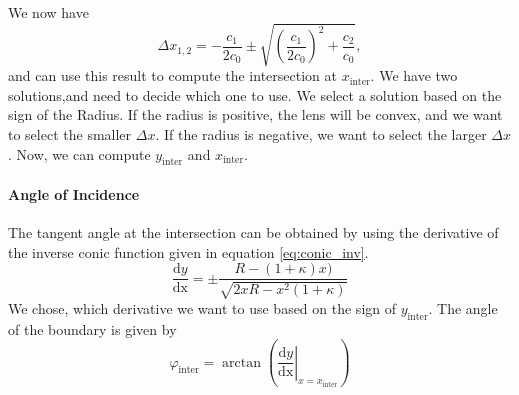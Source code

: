 \documentclass[12pt]{article}
\newcommand{\at}[2]{\left.#1\right|_{#2}}
\newcommand{\deriv}[2]{\frac{\mathrm{d}#1}{\mathrm{d#2}}}
\begin{document}
We now have
\begin{equation}\label{eq:conic_dx}
  \Delta x_{1, 2} = - \frac{c_1}{2 c_0} 
    \pm \sqrt{\left(\frac{c_1}{2 c_0}\right)^2 + \frac{c_2}{c_0}},
\end{equation}
and can use this result to compute the intersection at $x_\text{inter}$. We have two
solutions,and need to decide which one to use.
We select a solution based on the sign of the Radius. If the radius is positive, the lens
will be convex, and we want to select the smaller $\Delta x$. If the radius is negative,
we want to select the larger $\Delta x$.
Now, we can compute $y_\text{inter}$ and $x_\text{inter}$.

\paragraph{Angle of Incidence}
The tangent angle at the intersection can be obtained by using the derivative of the
inverse conic function given in equation \eqref{eq:conic_inv}.
\begin{equation}\label{eq:conic_inv_deriv}
  \deriv{y}{x} = \pm \frac{R - (1 + \kappa) x)}{\sqrt{2 x R - x^2(1 + \kappa)}}
\end{equation}
We chose, which derivative we want to use based on the sign of $y_\text{inter}$.
The angle of the boundary is given by
\begin{equation}\label{eq:conic_inter_angle}
  \varphi_\text{inter} = \arctan\left(\at{\deriv{y}{x}}{x = x_\text{inter}}\right)
\end{equation}
\end{document}
